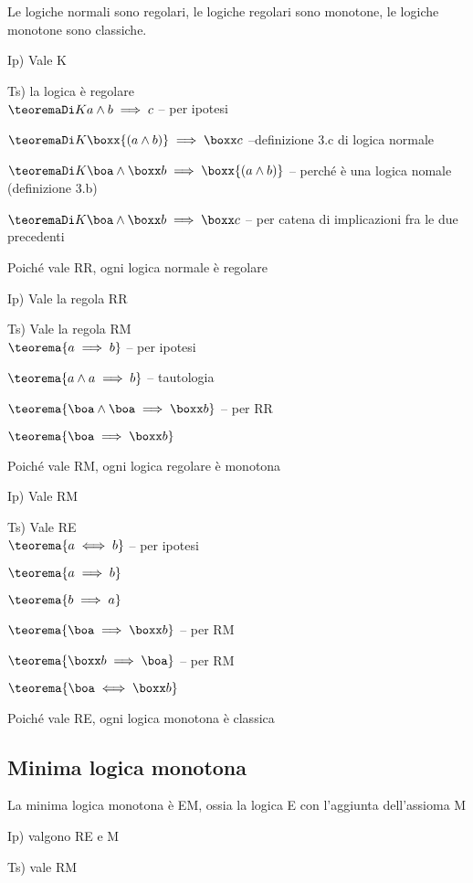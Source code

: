 Le logiche normali sono regolari, le logiche regolari sono monotone,
le logiche monotone sono classiche.

Ip) Vale K

Ts) la logica è regolare\\


$\teoremaDi Ka\wedge b\implies c$ -- per ipotesi

$\teoremaDi K\boxx{(a\wedge b)}\implies\boxx c$ --definizione 3.c
di logica normale

$\teoremaDi K\boa\wedge\boxx b\implies\boxx{(a\wedge b)}$ -- perché
è una logica nomale (definizione 3.b)

$\teoremaDi K\boa\wedge\boxx b\implies\boxx c$ -- per catena di implicazioni
fra le due precedenti

Poiché vale RR, ogni logica normale è regolare

Ip) Vale la regola RR

Ts) Vale la regola RM\\


$\teorema{a\implies b}$ -- per ipotesi

$\teorema{a\wedge a\implies b}$ -- tautologia

$\teorema{\boa\wedge\boa\implies\boxx b}$ -- per RR

$\teorema{\boa\implies\boxx b}$ 

Poiché vale RM, ogni logica regolare è monotona

Ip) Vale RM

Ts) Vale RE\\


$\teorema{a\iff b}$ -- per ipotesi

$\teorema{a\implies b}$

$\teorema{b\implies a}$

$\teorema{\boa\implies\boxx b}$ -- per RM

$\teorema{\boxx b\implies\boa}$ -- per RM

$\teorema{\boa\iff\boxx b}$

Poiché vale RE, ogni logica monotona è classica


\subsection{Minima logica monotona}

La minima logica monotona è EM, ossia la logica E con l'aggiunta dell'assioma
M

Ip) valgono RE e M

Ts) vale RM\\


